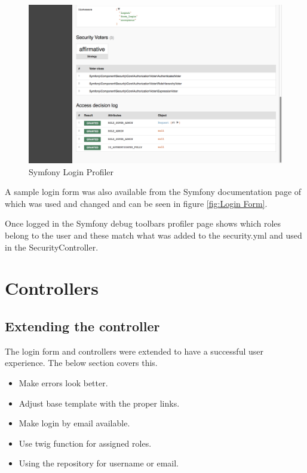 \begin{figure}[htbp]
   \centering
   \includegraphics[width=400pt]{figures/access_decision_logs.png} %
   \caption{Symfony Login Profiler}
   \label{fig:Symfony Login Profiler}
\end{figure}

A sample login form was also available from the Symfony documentation page of which was used and changed and can be seen in figure \ref{fig:Login Form}.

Once logged in the Symfony debug toolbars profiler page shows which roles belong to the user and these match what was added to the security.yml and used in the SecurityController.

\section{Controllers}

\subsection{Extending the controller}

The login form and controllers were extended to have a successful user experience. The below section covers this.

\begin{itemize}
  \item Make errors look better.
    \item Adjust base template with the proper links.
      \item Make login by email available.
        \item Use twig function for assigned roles.
          \item Using the repository for username or email.
\end{itemize}

